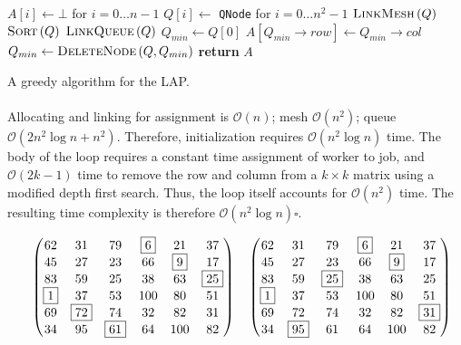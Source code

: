 \documentclass{article}
\newcommand{\boundedBy}[1]{\mathcal{O} \left ( #1 \right )}
\newcommand{\FuncCall}[2]{\textsc{#1} \left ( #2 \right )}
\begin{document}
\begin{algorithm}
\begin{algorithmic}
 
\State $A[i] \gets \bot$ for $i = 0 \ldots n - 1$ 
\State $Q[i] \gets$ \texttt{QNode} for $i = 0 \ldots n^2 - 1$
\State $\FuncCall{LinkMesh}{Q}$ 
\State $\FuncCall{Sort}{Q}$ 
\State $\FuncCall{LinkQueue}{Q}$ 
\State $Q_{min} \gets Q[0]$
	\State $A[ Q_{min} \rightarrow row ] \gets Q_{min} \rightarrow col$
	\State $Q_{min} \gets \FuncCall{DeleteNode}{Q, Q_{min}}$ 
\EndWhile
\State \textbf{return} $A$
\EndProcedure
\end{algorithmic}
\caption{A greedy algorithm for the LAP.}
\label{alg:greedy}
\end{algorithm}

\paragraph{} Allocating and linking for assignment is $\boundedBy{n}$; mesh $\boundedBy{n^2}$; queue $\boundedBy{2n^2\log n + n^2}$. Therefore, initialization requires $\boundedBy{n^2 \log n}$ time. The body of the loop requires a constant time assignment of worker to job, and $\boundedBy{2k - 1}$ time to remove the row and column from a $k \times k$ matrix using a modified depth first search. Thus, the loop itself accounts for $\boundedBy{n^2}$ time. The resulting time complexity is therefore $\boundedBy{n^2 \log n} \square$.

\begin{equation*}
\quad
\begin{pmatrix}
62 & 31 & 79 & \fbox{6} & 21 & 37 \\
45 & 27 & 23 & 66 & \fbox{9} & 17 \\
83 & 59 & 25 & 38 & 63 & \fbox{25} \\
\fbox{1} & 37 & 53 & 100 & 80 & 51 \\
69 & \fbox{72} & 74 & 32 & 82 & 31 \\
34 & 95 & \fbox{61} & 64 & 100 & 82 \\
\end{pmatrix}
\quad
\begin{pmatrix}
62 & 31 & 79 & \fbox{6} & 21 & 37 \\
45 & 27 & 23 & 66 & \fbox{9} & 17 \\
83 & 59 & \fbox{25} & 38 & 63 & 25 \\
\fbox{1} & 37 & 53 & 100 & 80 & 51 \\
69 & 72 & 74 & 32 & 82 & \fbox{31} \\
34 & \fbox{95} & 61 & 64 & 100 & 82 \\
\end{pmatrix}
\end{equation*}
\end{document}
